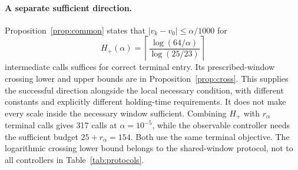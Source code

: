 \paragraph{A separate sufficient direction.}
Proposition~\ref{prop:common} states that $|v_k-v_0|\le\alpha/1000$ for
\begin{equation}
H_+(\alpha)=\left\lceil\frac{\log(64/\alpha)}{\log(25/23)}\right\rceil
\end{equation}
intermediate calls suffices for correct terminal entry. Its prescribed-window crossing lower and upper bounds are in Proposition~\ref{prop:cross}. This supplies the successful direction alongside the local necessary condition, with different constants and explicitly different holding-time requirements. It does not make every scale inside the necessary window sufficient. Combining $H_+$ with $r_\alpha$ terminal calls gives 317 calls at $\alpha=10^{-5}$, while the observable controller needs the sufficient budget $25+r_\alpha=154$. Both use the same terminal objective. The logarithmic crossing lower bound belongs to the shared-window protocol, not to all controllers in Table~\ref{tab:protocols}.

